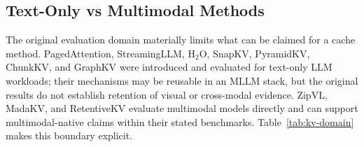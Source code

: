 \documentclass[10pt]{article}
\newenvironment{reviewchange}{\begingroup\color{red}}{\endgroup}
\begin{document}
\begin{reviewchange}
\subsection{Text-Only vs Multimodal Methods}
\label{sec:kv-domains}

The original evaluation domain materially limits what can be
claimed for a cache method.  PagedAttention, StreamingLLM, H$_2$O, SnapKV, PyramidKV,
ChunkKV, and GraphKV were introduced and evaluated for text-only LLM workloads; their
mechanisms may be reusable in an MLLM stack, but the original results do not establish
retention of visual or cross-modal evidence.  ZipVL, MadaKV, and RetentiveKV evaluate
multimodal models directly and can support multimodal-native claims within their stated
benchmarks.  Table~\ref{tab:kv-domain} makes this boundary explicit.


\end{reviewchange}
\end{document}
